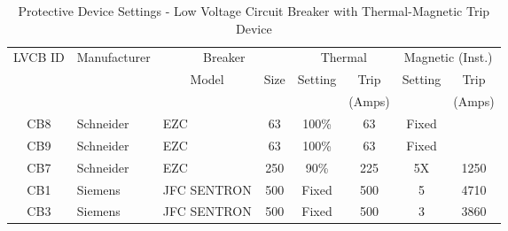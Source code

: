 \begin{table}[!htb]
	\caption{Protective Device Settings - Low Voltage Circuit Breaker with Thermal-Magnetic Trip Device}
	\label{ch04_elecaudit_protectioncoordination01}
	{\scriptsize
	\begin{tabular}{c|c|c|c|c|c|c|c}
		\hline
		LVCB ID & \multicolumn{1}{l|}{Manufacturer} & \multicolumn{2}{c|}{Breaker} & \multicolumn{2}{c|}{Thermal} & \multicolumn{2}{c}{Magnetic (Inst.)} \\ 
		\cline{3-8}
		& \multicolumn{1}{l|}{} & Model & Size & Setting & Trip & Setting & Trip \\ 
		\cline{3-8}
		& \multicolumn{1}{l|}{} &  &  &  & (Amps) &  & (Amps) \\ 
		\hline
		CB8 & \multicolumn{1}{l|}{Schneider} & \multicolumn{1}{l|}{EZC} & 63 & 100\% & 63 & Fixed &  \\ 
		CB9 & \multicolumn{1}{l|}{Schneider} & \multicolumn{1}{l|}{EZC} & 63 & 100\% & 63 & Fixed &  \\ 
		CB7 & \multicolumn{1}{l|}{Schneider} & \multicolumn{1}{l|}{EZC} & 250 & 90\% & 225 & 5X & 1250 \\ 
		CB1 & \multicolumn{1}{l|}{Siemens} & \multicolumn{1}{l|}{JFC SENTRON} & 500 & Fixed & 500 & 5 & 4710 \\ 
		CB3 & \multicolumn{1}{l|}{Siemens} & \multicolumn{1}{l|}{JFC SENTRON} & 500 & Fixed & 500 & 3 & 3860 \\ 
		\hline
	\end{tabular}
	
	}%
\end{table}